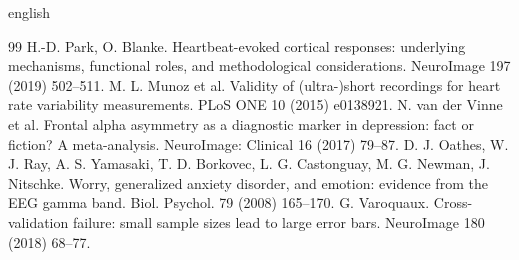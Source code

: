 \documentclass[10pt]{article}
\begin{document}
\begin{otherlanguage*}{english}
\begin{thebibliography}{99}
 H.-D. Park, O. Blanke. Heartbeat-evoked cortical responses: underlying mechanisms, functional roles, and methodological considerations. NeuroImage 197 (2019) 502--511.
 M. L. Munoz et al. Validity of (ultra-)short recordings for heart rate variability measurements. PLoS ONE 10 (2015) e0138921.
 N. van der Vinne et al. Frontal alpha asymmetry as a diagnostic marker in depression: fact or fiction? A meta-analysis. NeuroImage: Clinical 16 (2017) 79--87.
 D. J. Oathes, W. J. Ray, A. S. Yamasaki, T. D. Borkovec, L. G. Castonguay, M. G. Newman, J. Nitschke. Worry, generalized anxiety disorder, and emotion: evidence from the EEG gamma band. Biol. Psychol. 79 (2008) 165--170.
 G. Varoquaux. Cross-validation failure: small sample sizes lead to large error bars. NeuroImage 180 (2018) 68--77.
\end{thebibliography}
\end{otherlanguage*}
\end{document}
